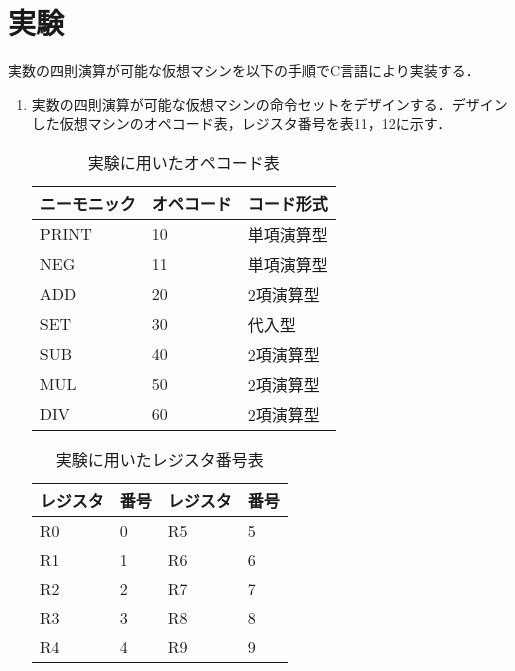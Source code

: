 \documentclass[a4j]{jsarticle}  %
\begin{document}
\section{実験}
実数の四則演算が可能な仮想マシンを以下の手順でC言語により実装する．
\begin{enumerate}
\item 実数の四則演算が可能な仮想マシンの命令セットをデザインする．デザインした仮想マシンのオペコード表，レジスタ番号を表11，12に示す．
\begin{table}[htb]
  \begin{center}
    \caption{実験に用いたオペコード表}
\begin{tabular}{l|ll} \hline
ニーモニック & オペコード & コード形式 \\ \hline
PRINT & 10 & 単項演算型  \\
NEG & 11 & 単項演算型  \\
ADD & 20 & 2項演算型  \\
SET & 30 & 代入型  \\
SUB & 40 & 2項演算型  \\
MUL & 50 & 2項演算型  \\
DIV & 60 & 2項演算型  \\\hline
\end{tabular} 
\end{center}
\end{table}

\begin{table}[htb]
  \begin{center}
    \caption{実験に用いたレジスタ番号表}
\begin{tabular}{l|l||l|l} \hline
レジスタ & 番号 & レジスタ & 番号 \\ \hline
R0 & 0 & R5 & 5 \\
R1 & 1 & R6 & 6 \\
R2 & 2 & R7 & 7 \\
R3 & 3 & R8 & 8 \\
R4 & 4 & R9 & 9  \\ \hline
\end{tabular} 
\end{center}
\end{table}


\end{enumerate}
\end{document}
